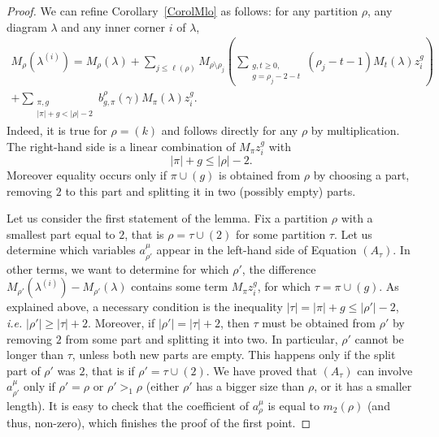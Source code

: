 \documentclass[11pt]{amsart}
\theoremstyle{plain}
\theoremstyle{remark}
\begin{document}
\begin{proof}
    We can refine Corollary~\ref{CorolMlo} as follows:
    for any partition $\rho$, any diagram $\lambda$ and any inner corner $i$ of $\lambda$,
\begin{multline}
    M_\rho(\lambda^{(i)}) = M_\rho(\lambda) + \sum_{j \leq \ell(\rho)}
    M_{\rho \setminus \rho_j} 
    \left( \sum_{\substack{g,t \geq 0, \\ g=\rho_j-2-t}} (\rho_j-t-1) M_t(\lambda) z_i^g \right)\\
    + \sum_{\substack{\pi,g \\ |\pi|+g < |\rho| - 2}} b_{g,\pi}^\rho(\gamma) M_\pi(\lambda) z_i^g.
    \label{eq:DsLemTriang}
\end{multline}
Indeed, it is true for $\rho=(k)$ and follows directly for any $\rho$ by multiplication.
The right-hand side is a linear combination of $M_\pi z_i^g$ with
\[  |\pi|+g \leq |\rho| - 2. \]
Moreover equality occurs only if $\pi \cup (g)$ is obtained from $\rho$
by choosing a part, removing $2$ to this part and
splitting it in two (possibly empty) parts.

Let us consider the first statement of the lemma.
Fix a partition $\rho$ with a smallest part equal to $2$,
that is $\rho=\tau \cup (2)$ for some partition $\tau$.
Let us determine which variables $a^\mu_{\rho'}$ appear
in the left-hand side of Equation $(A_\tau)$.
In other terms, we want to determine for which $\rho'$,
the difference $M_{\rho'}(\lambda^{(i)})-M_{\rho'}(\lambda)$ contains
some term $M_\pi z_i^g$, for which $\tau=\pi \cup (g)$.
As explained above,
a necessary condition is the inequality $|\tau|=|\pi|+g \leq |\rho'| - 2$, \emph{i.e.}
$|\rho'| \geq |\tau|+2$.
Moreover, if $|\rho'| = |\tau| +2$, then $\tau$ must be obtained from $\rho'$ by removing
$2$ from some part and splitting it into two.
In particular, $\rho'$ cannot be longer than $\tau$, unless both new
parts are empty.
This happens only if the split part of $\rho'$ was $2$, that is if $\rho'= \tau \cup (2)$.
We have proved that $(A_\tau)$ can involve $a^\mu_{\rho'}$
only if $\rho'=\rho$ or $\rho' >_1 \rho$ (either $\rho'$ has a bigger size than $\rho$, or it has a smaller length).
It is easy to check that the coefficient of $a^\mu_\rho$ is equal to $m_2(\rho)$
(and thus, non-zero),
which finishes the proof of the first point.


\end{proof}
\end{document}
